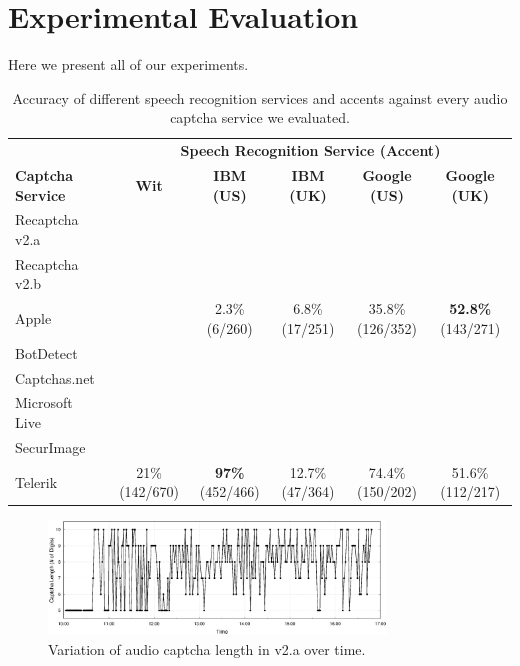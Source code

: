\section{Experimental Evaluation}
\label{sec:evaluation}

Here we present all of our experiments.

\begin{table}[t]
\centering
\caption{Accuracy of different speech recognition services and accents against every audio captcha service we evaluated.}
\begin{tabular}{lccccc}
\toprule
&\multicolumn{5}{c}{\textbf{Speech Recognition Service (Accent)}}\\
\cmidrule{2-6}
\textbf{Captcha Service}& \textbf{Wit}& \textbf{IBM (US)} & \textbf{ IBM (UK)} & \textbf{Google (US)} & \textbf{Google (UK)} \\
\hline
Recaptcha v2.a &  &  & & & \\
\rowcolor{Gray}
Recaptcha v2.b &  &  &  & & \\
Apple  &  & 2.3\% (6/260) & 6.8\% (17/251) & 35.8\% (126/352) & \textbf{52.8\%} (143/271) \\
\rowcolor{Gray}
BotDetect  &  & &  & & \\
Captchas.net  & &  &  & & \\
\rowcolor{Gray}
Microsoft Live & &  &  & & \\
SecurImage  &  & &  & & \\
\rowcolor{Gray}
Telerik  & 21\% (142/670)  & \textbf{97\%} (452/466) & 12.7\% (47/364) & 74.4\% (150/202) & 51.6\% (112/217) \\
\end{tabular}
\label{tab:combinations}
\end{table}



\begin{figure}
\centering
\includegraphics[width=0.8\textwidth]{figures/captcha_length.eps}
\caption{Variation of audio captcha length in \re v2.a over time.}
\label{fig:length}
\end{figure}

